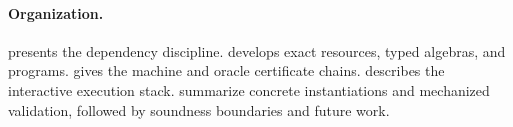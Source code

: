 \paragraph{Organization.}
 presents the dependency discipline.
 develops exact resources, typed algebras, and programs.
 gives the machine and oracle certificate chains.
 describes the interactive execution stack.
 summarize concrete instantiations and
mechanized validation, followed by soundness boundaries and future work.
